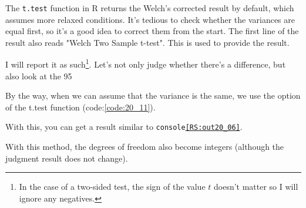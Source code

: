 \documentclass{ltjsbook}
\begin{document}
The \texttt{t.test} function in R returns the Welch's corrected result by default, which assumes more relaxed conditions. It's tedious to check whether the variances are equal first, so it's a good idea to correct them from the start. The first line of the result also reads "Welch Two Sample t-test". This is used to provide the result.

I will report it as such\footnote{In the case of a two-sided test, the sign of the value $t$ doesn't matter so I will ignore any negatives.}. Let’s not only judge whether there's a difference, but also look at the 95%


By the way, when we can assume that the variance is the same, we use the option of the t.test function (code:\ref{code:20_11}).



With this, you can get a result similar to \texttt{console\ref{RS:out20_06}}.


With this method, the degrees of freedom also become integers (although the judgment result does not change).

\end{document}
